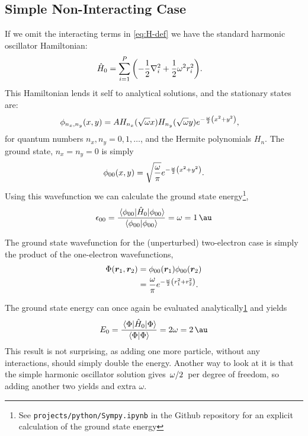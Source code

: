 \documentclass[a4paper, 11pt]{article}
\begin{document}
\begin{multicols}{2}
    \subsection{Simple Non-Interacting Case}
    If we omit the interacting terms in \autoref{eq:H-def} we have
    the standard harmonic oscillator Hamiltonian:
    \begin{align}
        \hat H_0 &= \sum_{i=1}^P\qty(-\frac{1}{2}\laplacian_i +
        \frac{1}{2}\omega^2 r_i^2).
    \end{align}
    This Hamiltonian lends it self to analytical solutions, and the stationary
    states are:
    \begin{align}
        \phi_{n_x, n_y}(x, y) &= A H_{n_x}(\sqrt\omega x)H_{n_y}(\sqrt\omega y)
        e^{-\frac{\omega}{2}\qty(x^2 + y^2)},
    \end{align} 
    for quantum numbers $n_x, n_y = 0, 1,\dots$, and the Hermite polynomials
    $H_n$. The ground state, $n_x=n_y=0$ is simply
    \begin{align}
        \phi_{00}(x,y) =
        \sqrt{\frac{\omega}{\pi}}e^{-\frac{\omega}{2}\qty(x^2+y^2)}.
    \end{align}
    Using this wavefunction we can calculate the ground state
    energy\footnote{\label{fnt:sympy}See \texttt{projects/python/Sympy.ipynb} in the Github
    repository for an explicit calculation of the ground state energy},
    \begin{align}
        \epsilon_{00} = \frac{\expval{\hat H_0}{\phi_{00}}}{\braket{\phi_{00}}}
        = \omega = \SI{1}{\au}
    \end{align}

    The ground state wavefunction for the (unperturbed) two-electron case is simply the
    product of the one-electron wavefunctions,
    \begin{align}
        \begin{split}
            \Phi(\bm r_1, \bm r_2) &= \phi_{00}(\bm r_1)\phi_{00}(\bm r_2)\\
            &= \frac{\omega}{\pi} e^{-\frac{\omega}{2}\qty(r_1^2+r_2^2)}.
        \end{split}\label{eq:Phi-non-inter}
    \end{align}

    The ground state energy can once again be evaluated
    analytically\cref{fnt:sympy} and yields
    \begin{align}
        E_0 = \frac{\expval{\hat H_0}{\Phi}}{\braket{\Phi}}
        = 2\omega =\SI{2}{\au}
    \end{align}
    This result is not surprising, as adding one more particle, without any
    interactions, should simply double the energy. Another way to look at it is
    that the simple harmonic oscillator solution gives $\flatfrac{\omega}{2}$
    per degree of freedom, so adding another two yields and extra $\omega$.



\end{multicols}
\end{document}
